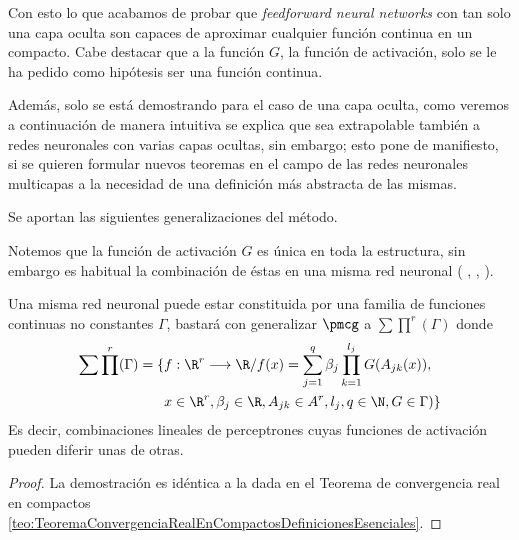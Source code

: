 Con esto lo que acabamos de probar que \textit{feedforward neural networks} con tan solo una capa oculta  son capaces de aproximar cualquier 
función continua en un compacto.  Cabe destacar que a la función $G$, la función de activación,
 solo se le ha pedido como 
hipótesis ser una función continua.     

Además, solo se está demostrando para el caso de una capa oculta, como veremos a continuación  de 
manera intuitiva se explica que sea extrapolable también a redes neuronales 
con varias capas ocultas, sin embargo; esto pone de manifiesto, si se quieren formular nuevos teoremas en el campo de las redes neuronales
multicapas a la necesidad de una definición más abstracta de las mismas. 


Se aportan las siguientes generalizaciones del método. 

Notemos que la función de activación $G$ es única en toda la estructura,
sin embargo es habitual la combinación de éstas en una misma red neuronal (
\cite{DBLP:journals/corr/abs-1811-03378}, 
 \cite{8258768}, 
 \cite{DBLP:journals/corr/SzegedyVISW15}
). 

\begin{corolario}

    Una misma red neuronal puede estar constituida por una familia de funciones continuas no constantes $\Gamma$, 
    bastará con generalizar $\pmcg$ a $\sum \prod ^r (\Gamma)$ donde 
    \begin{equation}
        \begin{split}
            \sum \prod^r (\Gamma) = \{ 
                &f: \R^r \longrightarrow \R /
                f(x) = \sum_{j = 1} ^q  \beta_j \prod_{k=1}^{l_j}
                G(A_{jk}(x)), \\
                &x  \in \R^r, \beta_j \in \R, A_{jk}\in A^r, l_j,q \in \N, G \in \Gamma
                )
                \}
        \end{split}
    \end{equation}
    Es decir, combinaciones lineales de perceptrones cuyas funciones 
    de activación pueden diferir unas de otras. 
\end{corolario}

\begin{proof}
    La demostración es idéntica a la dada en el Teorema de convergencia 
    real en compactos \ref{teo:TeoremaConvergenciaRealEnCompactosDefinicionesEsenciales}.
\end{proof}

